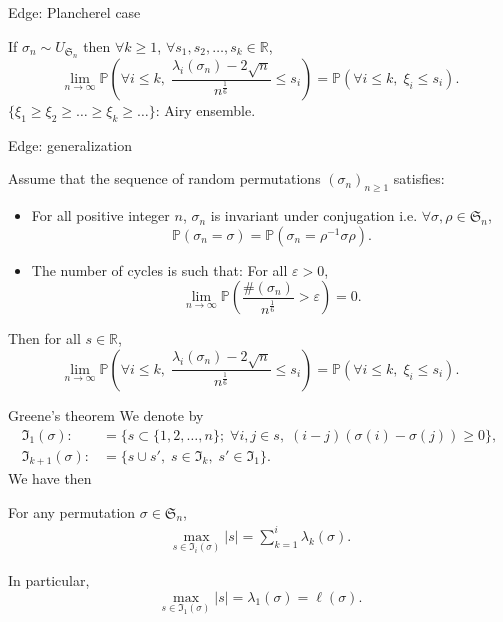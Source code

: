 \documentclass[english,xcolor=table]{beamer}
\begin{document}
\begin{frame}{Edge: Plancherel case}
\begin{theorem} 
 If $\sigma_n \sim {U}_{\mathfrak{S}_n}$ then  $\forall k \geq 1 $,  $\forall s_1,s_2,\dots,s_k \in \mathbb{R}$,
\begin{equation*} 
\lim_{n\to \infty}\mathbb{P}\left(\forall i\leq k, \;\frac{\lambda_i(\sigma_n)-2\sqrt{n}}{n^\frac{1}{6}}\leq s_i\right)=\mathbb{P}(\forall i\leq k,\;\xi_i\leq s_i).
\end{equation*}
$\{\xi_1\geq \xi_2\geq\dots\geq  \xi_k \geq  \dots \}$: Airy ensemble.
\end{theorem}

\end{frame}
\begin{frame}{Edge: generalization}
    \begin{theorem}[\cite{sk}]
Assume that the sequence of random permutations  $(\sigma_n)_{n\geq 1}$ satisfies:
\begin{itemize}
\item  For all positive integer $n$, $\sigma_n$ is invariant under conjugation i.e.  $\forall \sigma , \rho \in \mathfrak{S}_n$,
\begin{equation}\tag{H1}
\mathbb{P}(\sigma_n=\sigma)=\mathbb{P}(\sigma_n=\rho^{-1}\sigma\rho).
\end{equation}
\item The number of cycles is such that: For all $\varepsilon>0$,
\begin{equation}\tag{H2}
\lim_{n\to \infty}\mathbb{P}\left(\frac{\#(\sigma_n)}{n^\frac 16 }>\varepsilon\right) =0.
\end{equation}
\end{itemize}
Then  for all  $s \in \mathbb{R}$,
\begin{equation*} 
\lim_{n\to \infty}\mathbb{P}\left(\forall i\leq k, \;\frac{\lambda_i(\sigma_n)-2\sqrt{n}}{n^\frac{1}{6}}\leq s_i\right)=\mathbb{P}(\forall i\leq k,\;\xi_i\leq s_i).\end{equation*}
\end{theorem}
\end{frame}

\begin{frame}{Greene's theorem}
    We denote by  \begin{align*}
\mathfrak{I}_1(\sigma):&=\{s\subset\{1,2,\dots,n\};\; \forall i,j \in s,\; (i-j)(\sigma(i)-\sigma(j))\geq 0 \},
\\\mathfrak{I}_{k+1}(\sigma):&=\{s\cup s',\; s\in \mathfrak{I}_k,\;s'\in \mathfrak{I}_1\}.
\end{align*}
We have then
\begin{lemma}
For any permutation $ \sigma\in \mathfrak{S}_n$,
\begin{align*}
\max_{s\in \mathfrak{I}_i(\sigma)} |s| =\sum_{k=1}^i \lambda_k(\sigma).
\end{align*}
\end{lemma}
In particular, $$\max_{s\in \mathfrak{I}_1(\sigma)} |s| =\lambda_1(\sigma)=\ell(\sigma).$$
\end{frame}
\end{document}
